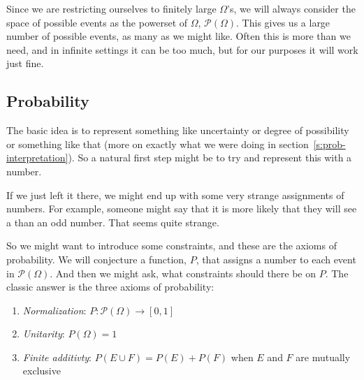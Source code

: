 Since we are restricting ourselves to finitely large $\Omega$'s, we will always consider the space of possible events as the powerset of $\Omega$, $\mathscr{P}(\Omega)$. This gives us a large number of possible events, as many as we might like.  Often this is more than we need, and in infinite settings it can be too much, but for our purposes it will work just fine.

\subsection{Probability}

The basic idea is to represent something like uncertainty or degree of possibility or something like that (more on exactly what we were doing in section~\ref{s:prob-interpretation}).  So a natural first step might be to try and represent this with a number.

If we just left it there, we might end up with some very strange assignments of numbers.  For example, someone might say that it is more likely that they will see a  than an odd number. That seems quite strange.


So we might want to introduce some constraints, and these are the axioms of probability. We will conjecture a function, $P$, that assigns a number to each event in $\mathscr{P}(\Omega)$.  And then we might ask, what constraints should there be on $P$.  The classic answer is the three axioms of probability:


\begin{enumerate}
\item {\it Normalization}: $P: \mathscr{P}(\Omega) \to [0,1]$
\item {\it Unitarity}: $P(\Omega) = 1$
\item {\it Finite additivty}: $P(E \cup F) = P(E) + P(F)$ when $E$ and $F$ are mutually exclusive
\end{enumerate}


